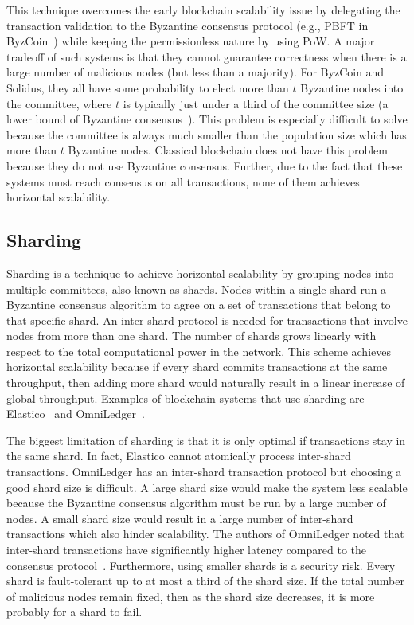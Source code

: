 This technique overcomes the early blockchain scalability issue by delegating the transaction validation to the Byzantine consensus protocol (e.g., PBFT in ByzCoin~\cite{kogias2016enhancing})
while keeping the permissionless nature by using PoW.
A major tradeoff of such systems is that they cannot guarantee correctness when there is a large number of malicious nodes (but less than a majority).
For ByzCoin and Solidus, they all have some probability to elect more than $t$ Byzantine nodes into the committee,
where $t$ is typically just under a third of the committee size (a lower bound of Byzantine consensus~\cite{pease1980reaching}).
This problem is especially difficult to solve because the committee is always much smaller than the population size which has more than $t$ Byzantine nodes.
Classical blockchain does not have this problem because they do not use Byzantine consensus.
Further, due to the fact that these systems must reach consensus on all transactions, none of them achieves horizontal scalability.

\subsection{Sharding}
\label{sec:sharding}

Sharding is a technique to achieve horizontal scalability by grouping nodes into multiple committees, also known as shards.
Nodes within a single shard run a Byzantine consensus algorithm to agree on a set of transactions that belong to that specific shard.
An inter-shard protocol is needed for transactions that involve nodes from more than one shard.
The number of shards grows linearly with respect to the total computational power in the network.
This scheme achieves horizontal scalability because if every shard commits transactions at the same throughput,
then adding more shard would naturally result in a linear increase of global throughput.
Examples of blockchain systems that use sharding are Elastico~\cite{luu2016elastico} and Omni\-Ledger~\cite{kokoris2017omniledger}.

The biggest limitation of sharding is that it is only optimal if transactions stay in the same shard.
In fact, Elastico cannot atomically process inter-shard transactions.
OmniLedger has an inter-shard transaction protocol but choosing a good shard size is difficult.
A large shard size would make the system less scalable because the Byzantine consensus algorithm must be run by a large number of nodes.
A small shard size would result in a large number of inter-shard transactions which also hinder scalability.
The authors of OmniLedger noted that inter-shard transactions have significantly higher latency compared to the consensus protocol~\cite{kokoris2017omniledger}.
Furthermore, using smaller shards is a security risk.
Every shard is fault-tolerant up to at most a third of the shard size.
If the total number of malicious nodes remain fixed, then as the shard size decreases,
it is more probably for a shard to fail.

